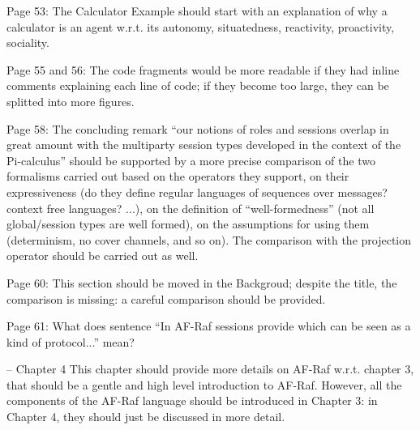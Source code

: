 \documentclass{article}
\newcommand{\todo}[1]{[\textcolor{red}{TODO}: #1]}
\newenvironment{them}{\noindent\begingroup\color{blue}}{\endgroup\par}
\begin{document}
\begin{them}

Page 53:
The Calculator Example should start with an explanation of why a calculator is an agent w.r.t. its autonomy, situatedness, reactivity, proactivity, sociality.
\end{them}
\todo{}

\begin{them}

Page 55 and 56:
The code fragments would be more readable if they had inline comments explaining each line of
code; if they become too large, they can be splitted into more figures.
\end{them}
\todo{}

\begin{them}

Page 58:
The concluding remark “our notions of roles and sessions overlap in great amount with the
multiparty session types developed in the context of the Pi-calculus” should be supported by a more
precise comparison of the two formalisms carried out based on the operators they support, on their
expressiveness (do they define regular languages of sequences over messages? context free
languages? ...), on the definition of “well-formedness” (not all global/session types are well formed),
on the assumptions for using them (determinism, no cover channels, and so on). The comparison
with the projection operator should be carried out as well.
\end{them}
\todo{}

\begin{them}

Page 60:
This section should be moved in the Backgroud; despite the title, the comparison is missing: a careful
comparison should be provided.
\end{them}
\todo{}

\begin{them}

Page 61:
What does sentence “In AF-Raf sessions provide which can be seen as a kind of protocol...” mean?
\end{them}
\todo{}

\begin{them}

-- Chapter 4
This chapter should provide more details on AF-Raf w.r.t. chapter 3, that should be a gentle and high
level introduction to AF-Raf. However, all the components of the AF-Raf language should be
introduced in Chapter 3: in Chapter 4, they should just be discussed in more detail.
\end{them}
\todo{}
\end{document}
